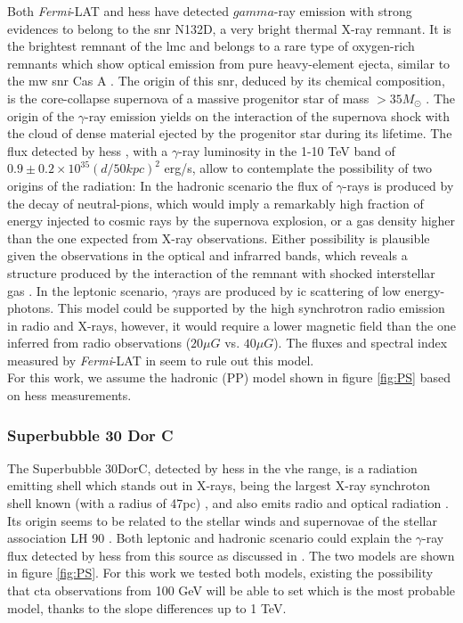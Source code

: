 \documentclass[main.tex]{subfiles}
\begin{document}
Both \textit{Fermi}-LAT and \gls{hess} have detected $gamma$-ray emission with strong evidences to belong to the \gls{snr} N132D, a very bright thermal X-ray remnant. It is the brightest remnant of the \gls{lmc} and belongs to a rare type of oxygen-rich remnants which show optical emission from pure heavy-element ejecta, similar to the \gls{mw} \gls{snr} Cas A \cite{2007N132D}. The origin of this \gls{snr}, deduced by its chemical composition, is the core-collapse supernova of a massive progenitor star of mass $> 35 M_{\odot}$ \cite{2007N132D}. The origin of the $\gamma$-ray emission yields on the interaction of the supernova shock with the cloud of dense material ejected by the progenitor star during its lifetime. The flux detected by \gls{hess} \cite{2015HESSTeVLMC}, with a $\gamma$-ray luminosity in the 1-10 TeV band of $0.9 \pm 0.2 \times 10^{35}(d/50kpc)^2$ erg/s, allow to contemplate the possibility of two origins of the radiation: In the hadronic scenario the flux of $\gamma$-rays is produced by the decay of neutral-pions, which would imply a remarkably high fraction of energy injected to cosmic rays by the supernova explosion, or a gas density higher than the one expected from X-ray observations. Either possibility is plausible given the observations in the optical and infrarred bands, which reveals a structure produced by the interaction of the remnant with shocked interstellar gas \cite{2006shockn132D}. In the leptonic scenario, $\gamma$rays are produced by \gls{ic} scattering of low energy-photons. This model could be supported by the high synchrotron radio emission in radio and X-rays, however, it would require a lower magnetic field than the one inferred from radio observations ($20 \mu G$ vs. $40\mu G$). The fluxes and spectral index measured by \textit{Fermi}-LAT in \cite{2016LMCFermiLAT} seem to rule out this model.\\
For this work, we assume the hadronic (PP) model shown in figure \ref{fig:PS} based on \gls{hess} measurements.


\subsubsection{Superbubble 30 Dor C}

The Superbubble 30DorC, detected by \gls{hess} in the \gls{vhe} range, is a radiation emitting shell which stands out in X-rays, being the largest X-ray synchroton shell known (with a radius of 47pc) \cite{200430dorcxrays}, and also emits radio and optical radiation \cite{1985SNRsintheLMC30dorc}. Its origin seems to be related to the stellar winds and supernovae of the stellar association LH 90 \cite{198430dorLH90}. Both leptonic and hadronic scenario could explain the $\gamma$-ray flux detected by \gls{hess} from this source as discussed in \cite{2015HESSTeVLMC}. The two models are shown in figure \ref{fig:PS}. For this work we tested both models, existing the possibility that \gls{cta} observations from 100 GeV will be able to set which is the most probable model, thanks to the slope differences up to 1 TeV.
\end{document}
